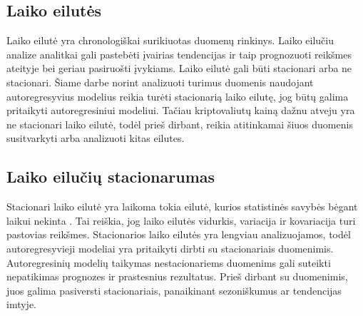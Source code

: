\documentclass{VUMIFInfKursinis}
\begin{document}
\subsection {Laiko eilutės}
Laiko eilutė yra chronologiškai surikiuotas duomenų rinkinys. Laiko eilučiu analize analitkai gali pastebėti įvairias tendencijas ir taip prognozuoti reikšmes
ateityje bei geriau pasiruošti įvykiams. Laiko eilutė gali būti stacionari arba ne stacionari. Šiame darbe norint analizuoti turimus duomenis naudojant 
autoregresyvius modelius reikia turėti stacionarią laiko eilutę, jog būtų galima pritaikyti autoregresiniui modeliui. Tačiau kriptovaliutų kainą dažnu atveju yra
ne stacionari laiko eilutė, todėl prieš dirbant, reikia atitinkamai šiuos duomenis susitvarkyti arba analizuoti kitas eilutes.

\subsection {Laiko eilučių stacionarumas}
Stacionari laiko eilutė yra laikoma tokia eilutė, kurios statistinės savybės bėgant laikui nekinta \cite{nason2006stationary}. Tai reiškia, jog laiko eilutės vidurkis,
variacija ir kovariacija turi pastovias reikšmes. Stacionarios laiko eilutės yra lengviau analizuojamos, todėl autoregresyvieji modeliai yra pritaikyti dirbti su 
stacionariais duomenimis. Autoregresinių modelių taikymas nestacionariems duomenims gali suteikti nepatikimas prognozes ir prastesnius rezultatus. 
Prieš dirbant su duomenimis, juos galima pasiversti stacionariais, panaikinant sezoniškumus ar tendencijas imtyje.
\end{document}
